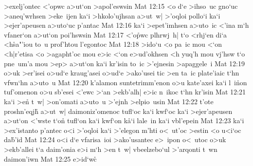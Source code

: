 >exelj'ontec
<'opwc
a>ut`on
>apol'eswsin\bibvsend
\vs Mat 12:15
<o
d`e
>ihso~uc
gno`uc
>aneq'wrhsen
>eke~ijen
ka`i
>hkolo'ujhsan
a>ut~w|
>'oqloi
pollo`i
ka`i
>ejer'apeusen
a>uto`uc
p'antac\bibvsend
\vs Mat 12:16
ka`i
>epet'imhsen
a>uto~ic
<'ina
m`h
vfaner`on
a>ut`on
poi'hswsin\bibvsend
\vs Mat 12:17
<'o\r{p}wc
plhrwj~h|
t`o
<rhj`en
di`a
<h\r{s}a"'iou
to~u
prof'htou
l'egontoc\bibvsend
\vs Mat 12:18
>ido`u
<o
pa~ic
mou
<`on
<h|r'etisa
<o
>agapht'oc
mou
e>ic
<`on
e>ud'okhsen
<h
yuq'h
mou
vj'hsw
t`o
pne~um'a
mou
>ep>
a>ut`on
ka`i
kr'isin
to~ic
>'ejnesin
>apaggele~i\bibvsend
\vs Mat 12:19
o>uk
>er'isei
o>ud`e
kraug'asei
o>ud`e
>ako'usei
tic
>en
ta~ic
plate'iaic
t`hn
vfwn`hn
a>uto~u\bibvsend
\vs Mat 12:20
k'alamon
suntetrimm'enon
o>u
kate'axei
ka`i
l~i\r{n}on
tuf'omenon
o>u
sb'esei
<'ewc
>`an
>ekb'alh|
e>ic
n~ikoc
t`hn
kr'isin\bibvsend
\vs Mat 12:21
ka`i
>e\r{n}
t~w|
>on'omati
a>uto~u
>'ejnh
>elpio~usin\bibvsend
\vs Mat 12:22
t'ote
proshn'eqjh\r{}
a>ut~w|
daimoniz'omenoc
tufl`oc
ka`i
kwf`oc
ka`i
>ejer'apeusen
a>ut`on
<'wste
t`on\r{}
tufl`on
ka`i
kwf`on
k\r{a}`i
lale~in
ka`i
vbl'epein\bibvsend
\vs Mat 12:23
ka`i
>ex'istanto
p'antec
o<i
>'oqloi
ka`i
>'elegon
m'hti
o<~ut'oc
>estin
<o
u<i`oc
da\r{b}'id\bibvsend
{}
\vs Mat 12:24
o<i
d`e
vfarisa~ioi
>ako'usantec
e>~ipon
o<~utoc
o>uk
>ekb'allei
t`a
daim'onia
e>i
m`h
>en
t~w|
vbeelzebo`ul
>'arqonti
t~wn
daimon'iwn\bibvsend
\vs Mat 12:25
e>id`wc\r{}
